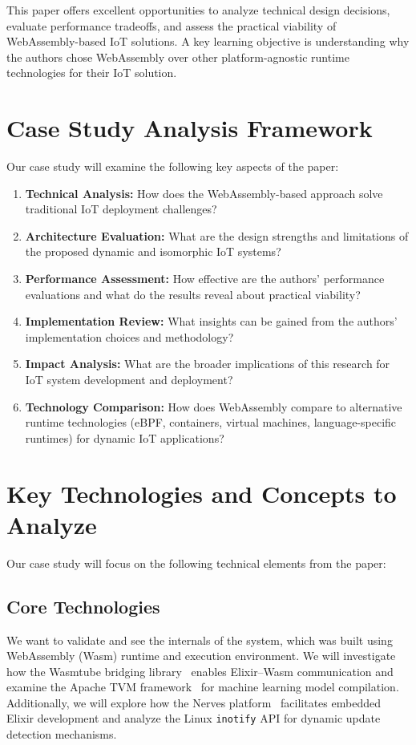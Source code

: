 \documentclass[11pt]{article}
\begin{document}
This paper offers excellent opportunities to analyze technical design decisions, evaluate performance tradeoffs, and assess the practical viability of WebAssembly-based IoT solutions. A key learning objective is understanding why the authors chose WebAssembly over other platform-agnostic runtime technologies for their IoT solution.

\section*{Case Study Analysis Framework}
Our case study will examine the following key aspects of the paper:

\begin{enumerate}
\item \textbf{Technical Analysis:} How does the WebAssembly-based approach solve traditional IoT deployment challenges?
\item \textbf{Architecture Evaluation:} What are the design strengths and limitations of the proposed dynamic and isomorphic IoT systems?
\item \textbf{Performance Assessment:} How effective are the authors' performance evaluations and what do the results reveal about practical viability?
\item \textbf{Implementation Review:} What insights can be gained from the authors' implementation choices and methodology?
\item \textbf{Impact Analysis:} What are the broader implications of this research for IoT system development and deployment?
\item \textbf{Technology Comparison:} How does WebAssembly compare to alternative runtime technologies (eBPF, containers, virtual machines, language-specific runtimes) for dynamic IoT applications?
\end{enumerate}

\section*{Key Technologies and Concepts to Analyze}
Our case study will focus on the following technical elements from the paper:

\subsection*{Core Technologies}
We want to validate and see the internals of the system, which was built using WebAssembly (Wasm) runtime and execution environment. We will investigate how the Wasmtube bridging library~\cite{wasmtube2023} enables Elixir–Wasm communication and examine the Apache TVM framework~\cite{apachetvm2023} for machine learning model compilation. Additionally, we will explore how the Nerves platform~\cite{nerves2023} facilitates embedded Elixir development and analyze the Linux \texttt{inotify} API for dynamic update detection mechanisms.
\end{document}
